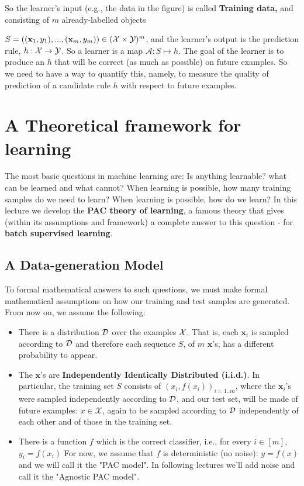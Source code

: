 \documentclass[11pt]{article}
\newcommand{\Xc}{\mathcal{X}}
\begin{document}
So the learner's input (e.g., the data in the figure) is called \textbf{Training data,} and consisting of $m$ already-labelled objects {$S=((\mathbf{x}_1,y_1),...,(\mathbf{x}_m,y_m)) \in  (\mathcal{X}\times \mathcal{Y})^m$, and the learner's output is the prediction rule, $h:\mathcal{X}\to \mathcal{Y}$. So a learner is a map $\mathcal{A}:S\mapsto h$. The goal of the learner is to produce an $h$ that will be correct (as much as possible) on future examples.  So we need to have a way to quantify this, namely, to measure the quality of prediction of a candidate rule  $h$ with respect to future examples. 

\section{A Theoretical framework for learning}

The most basic questions in machine learning are: Is anything learnable? what
can be learned and what cannot? When learning is possible, how many training
samples do we need to learn? When learning is possible, how do we learn? In this lecture we develop the {\bf PAC theory of
learning}, a famous theory that gives (within its assumptions and framework) a complete
answer to this question - for {\bf batch  supervised learning}. 

\subsection{A Data-generation Model }
To formal mathematical answers to such questions, we must make formal
mathematical assumptions on how our training and test samples are generated.
From now on, we assume the following:
\begin{itemize}
  \item There is a distribution $\mathcal{D}$ over the examples $\mathcal{X}$.  That is, each $\mathbf{x}_i$ is sampled according to $\mathcal{D}$ and therefore each sequence $S$, of $m$ $\mathbf{x}$'s, has a different probability to appear.
  \item The $\mathbf{x}$'s are \textbf{Independently Identically Distributed (i.i.d.)}.
  In particular, the training set $S$ consists of $(x_i,f(x_i))_{i=1.. m}$, where the $\mathbf{x}_i$'s were sampled independently according to $\mathcal{D}$, and our test set, will be made of future examples: $x\in\Xc$, again to be  sampled according to $\mathcal{D}$ independently of each other and of those in the training set.
  \item There is a function $f$ which is the correct classifier, i.e., for every $i \in [m]$, $y_i = f(x_i)$
  For now, we assume that $f$ is deterministic (no noise): $y=f(x)$ and we will call it the "PAC model". 
  In following lectures we'll add noise and call it the "Agnostic PAC model".
\end{itemize}

}
\end{document}
